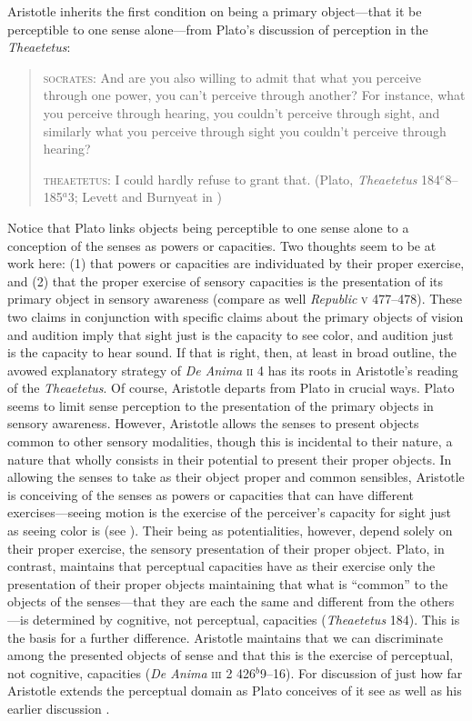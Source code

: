 Aristotle inherits the first condition on being a primary object---that it be perceptible to one sense alone---from Plato's discussion of perception in the \emph{Theaetetus}:
\begin{quotation}
	\textsc{socrates}: And are you also willing to admit that what you perceive through one power, you can't perceive through another? For instance, what you perceive through hearing, you couldn't perceive through sight, and similarly what you perceive through sight you couldn't perceive through hearing?
	
	\textsc{theaetetus}: I could hardly refuse to grant that. (Plato, \emph{Theaetetus} 184\( ^{e} \)8--185\( ^{a} \)3; Levett and Burnyeat in \citealt[204]{Cooper:1997fk})
\end{quotation}
Notice that Plato links objects being perceptible to one sense alone to a conception of the senses as powers or capacities. Two thoughts seem to be at work here: (1) that powers or capacities are individuated by their proper exercise, and (2) that the proper exercise of sensory capacities is the presentation of its primary object in sensory awareness (compare as well \emph{Republic} \textsc{v} 477--478). These two claims in conjunction with specific claims about the primary objects of vision and audition imply that sight just is the capacity to see color, and audition just is the capacity to hear sound. If that is right, then, at least in broad outline, the avowed explanatory strategy of \emph{De Anima} \textsc{ii} 4 has its roots in Aristotle's reading of the \emph{Theaetetus}. Of course, Aristotle departs from Plato in crucial ways. Plato seems to limit sense perception to the presentation of the primary objects in sensory awareness. However, Aristotle allows the senses to present objects common to other sensory modalities, though this is incidental to their nature, a nature that wholly consists in their potential to present their proper objects. In allowing the senses to take as their object proper and common sensibles, Aristotle is conceiving of the senses as powers or capacities that can have different exercises---seeing motion is the exercise of the perceiver's capacity for sight just as seeing color is (see \citealt{Freeland:1986fp}). Their being as potentialities, however, depend solely on their proper exercise, the sensory presentation of their proper object. Plato, in contrast, maintains that perceptual capacities have as their exercise only the presentation of their proper objects maintaining that what is ``common'' to the objects of the senses---that they are each the same and different from the others---is determined by cognitive, not perceptual, capacities (\emph{Theaetetus} 184). This is the basis for a further difference. Aristotle maintains that we can discriminate among the presented objects of sense and that this is the exercise of perceptual, not cognitive, capacities (\emph{De Anima} \textsc{iii} 2 426\( ^{b} \)9--16). For discussion of just how far Aristotle extends the perceptual domain as Plato conceives of it see \citealt{Sorabji:2003fk} as well as his earlier discussion \citealt{Sorabji:1971fr}.

